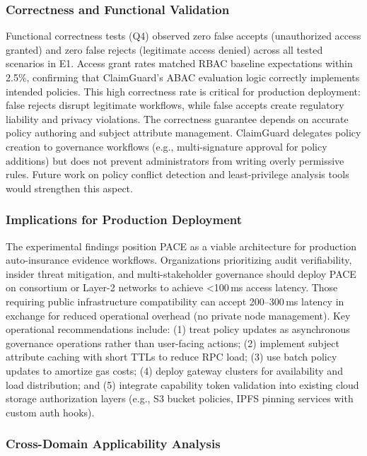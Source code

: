 \documentclass[pdflatex,sn-mathphys-num]{sn-jnl}
\begin{document}
\subsubsection{Correctness and Functional Validation}

Functional correctness tests (Q4) observed zero false accepts (unauthorized access granted) and zero false rejects (legitimate access denied) across all tested scenarios in E1. Access grant rates matched RBAC baseline expectations within 2.5\%, confirming that ClaimGuard's ABAC evaluation logic correctly implements intended policies. This high correctness rate is critical for production deployment: false rejects disrupt legitimate workflows, while false accepts create regulatory liability and privacy violations. The correctness guarantee depends on accurate policy authoring and subject attribute management. ClaimGuard delegates policy creation to governance workflows (e.g., multi-signature approval for policy additions) but does not prevent administrators from writing overly permissive rules. Future work on policy conflict detection and least-privilege analysis tools would strengthen this aspect.

\subsubsection{Implications for Production Deployment}

The experimental findings position PACE as a viable architecture for production auto-insurance evidence workflows. Organizations prioritizing audit verifiability, insider threat mitigation, and multi-stakeholder governance should deploy PACE on consortium or Layer-2 networks to achieve <100\,ms access latency. Those requiring public infrastructure compatibility can accept 200--300\,ms latency in exchange for reduced operational overhead (no private node management). Key operational recommendations include: (1) treat policy updates as asynchronous governance operations rather than user-facing actions; (2) implement subject attribute caching with short TTLs to reduce RPC load; (3) use batch policy updates to amortize gas costs; (4) deploy gateway clusters for availability and load distribution; and (5) integrate capability token validation into existing cloud storage authorization layers (e.g., S3 bucket policies, IPFS pinning services with custom auth hooks).

\subsubsection{Cross-Domain Applicability Analysis}
\end{document}
